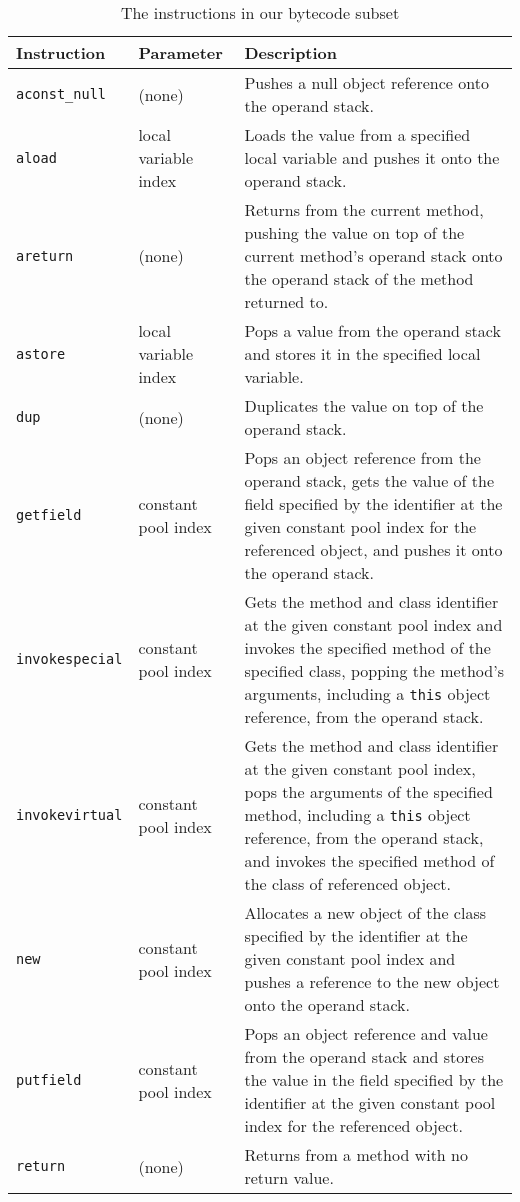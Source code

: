\begin{table}
  \centering
  \begin{tabular}{llp{8cm}}
    \hline
    Instruction & Parameter & Description \\
    \hline
    \texttt{aconst\_null} & (none) & 
    Pushes a null object reference onto the operand stack.
    \\
    \texttt{aload} & local variable index &
    Loads the value from a specified local variable and pushes it
    onto the operand stack.
    \\
    \texttt{areturn} & (none) &
    Returns from the current method, pushing the value on top of the
    current method's operand stack onto the operand stack of the
    method returned to.
    \\
    \texttt{astore} & local variable index &
    Pops a value from the operand stack and stores it in the specified
    local variable.
    \\
    \texttt{dup} & (none) &
    Duplicates the value on top of the operand stack.
    \\
    \texttt{getfield} & constant pool index &
    Pops an object reference from the operand stack, gets the value of
    the field specified by the identifier at the given constant pool
    index for the referenced object, and pushes it onto the operand
    stack.
    \\
    \texttt{invokespecial} & constant pool index &
    Gets the method and class identifier at the given constant pool
    index and invokes the specified method of the specified class,
    popping the method's arguments, including a \texttt{this} object
    reference, from the operand stack.
    \\
    \texttt{invokevirtual} & constant pool index &
    Gets the method and class identifier at the given constant pool
    index, pops the arguments of the specified method, including a
    \texttt{this} object reference, from the operand stack, and
    invokes the specified method of the class of referenced object.
    \\
    \texttt{new} & constant pool index &
    Allocates a new object of the class specified by the identifier at
    the given constant pool index and pushes a reference to the new
    object onto the operand stack.
    \\
    \texttt{putfield} & constant pool index &
    Pops an object reference and value from the operand stack and
    stores the value in the field specified by the identifier at the
    given constant pool index for the referenced object.
    \\
    \texttt{return} & (none) &
    Returns from a method with no return value.
    \\
    \hline
  \end{tabular}
  \caption{The instructions in our bytecode subset}
  \label{bytecode-subset-table}
\end{table}

